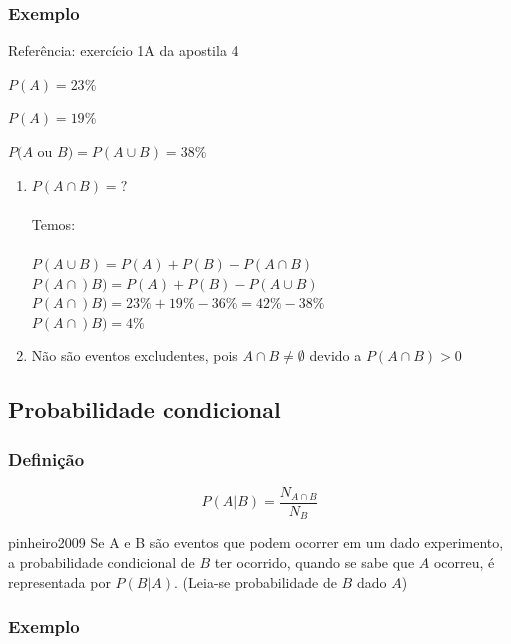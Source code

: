 \documentclass[a4paper]{article}
\begin{document}
	\subsubsection{Exemplo}
	
	Referência: exercício 1A da apostila 4
	
	$P(A) = 23\%$
	
	$P(A) = 19\%$
	
	$P(A$ ou $B) = P(A \cup B) = 38\%$
	
	\begin{enumerate}[label=\alph*.]
		\item $P(A \cap B) = ?$ \\
			\\
			Temos: \\
			\\
			$P(A \cup B) = P(A) + P(B) - P(A \cap B)$ \\
			$P(A \cap) B) = P(A) + P(B) - P(A \cup B)$ \\
			$P(A \cap) B) = 23\% + 19\% - 36\% = 42\% - 38\%$ \\
			$P(A \cap) B) =	4\%$
		\item Não são eventos excludentes, pois $A \cap B \neq \emptyset$ devido a $P(A \cap B) > 0$
	\end{enumerate}

	\subsection{Probabilidade condicional}
	
	\subsubsection{Definição}
	
	\begin{equation*}
		P(A | B) = \dfrac{N_{A \cap B}}{N_B}
	\end{equation*}
	
	\begin{displaycquote}[p. 75]{pinheiro2009}
		Se A e B são eventos que podem ocorrer em um dado experimento, a probabilidade condicional de $B$ ter ocorrido, quando se sabe que $A$ ocorreu, é representada por $P(B|A)$. (Leia-se probabilidade de $B$ dado $A$)
	\end{displaycquote}
	
	\subsubsection{Exemplo}
	
\end{document}
